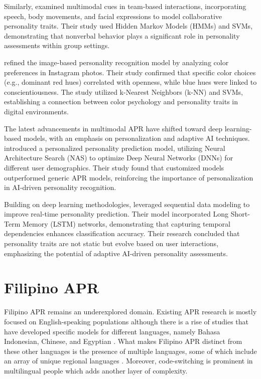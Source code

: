 Similarly, \citet{Batrinca2016} examined multimodal cues in team-based interactions, incorporating speech, body movements, and facial expressions to model collaborative personality traits. Their study used Hidden Markov Models (HMMs) and SVMs, demonstrating that nonverbal behavior plays a significant role in personality assessments within group settings.

\citet{Branz2020} refined the image-based personality recognition model by analyzing color preferences in Instagram photos. Their study confirmed that specific color choices (e.g., dominant red hues) correlated with openness, while blue hues were linked to conscientiousness. The study utilized k-Nearest Neighbors (k-NN) and SVMs, establishing a connection between color psychology and personality traits in digital environments.

The latest advancements in multimodal APR have shifted toward deep learning-based models, with an emphasis on personalization and adaptive AI techniques. \citet{Salam2022} introduced a personalized personality prediction model, utilizing Neural Architecture Search (NAS) to optimize Deep Neural Networks (DNNs) for different user demographics. Their study found that customized models outperformed generic APR models, reinforcing the importance of personalization in AI-driven personality recognition.

Building on deep learning methodologies, \citet{Lima2022} leveraged sequential data modeling to improve real-time personality prediction. Their model incorporated Long Short-Term Memory (LSTM) networks, demonstrating that capturing temporal dependencies enhances classification accuracy. Their research concluded that personality traits are not static but evolve based on user interactions, emphasizing the potential of adaptive AI-driven personality assessments.


\section{Filipino APR}
\label{sec: FilipinoAPR}
Filipino APR remains an underexplored domain. Existing APR research is mostly focused on English-speaking populations although there is a rise of studies that have developed specific models for different languages, namely Bahasa Indonesian, Chinese, and Egyptian \citep{Siddique2019, Salem2019, Adi2018}. What makes Filipino APR distinct from these other languages is the presence of multiple languages, some of which include an array of unique regional languages \citep{Tighe_Acorda_Agno_Gano_Go_Santiago_Sedillo_2022,tighe_modeling_2018}. Moreover, code-switching is prominent in multilingual people which adds another layer of complexity.

